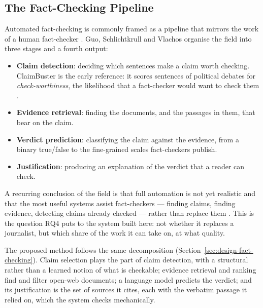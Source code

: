 
\subsection{The Fact-Checking Pipeline}

Automated fact-checking is commonly framed as a pipeline that mirrors
the work of a human fact-checker \cite{thorne2018automated,
guo2022survey}. Guo, Schlichtkrull and Vlachos organise the field into
three stages and a fourth output:

\begin{itemize}
    \item \textbf{Claim detection}: deciding which sentences make a
    claim worth checking. ClaimBuster is the early reference: it scores
    sentences of political debates for \emph{check-worthiness}, the
    likelihood that a fact-checker would want to check them
    \cite{hassan2017claimbuster}.
    \item \textbf{Evidence retrieval}: finding the documents, and the
    passages in them, that bear on the claim.
    \item \textbf{Verdict prediction}: classifying the claim against
    the evidence, from a binary true/false to the fine-grained scales
    fact-checkers publish.
    \item \textbf{Justification}: producing an explanation of the
    verdict that a reader can check.
\end{itemize}

A recurring conclusion of the field is that full automation is not yet
realistic and that the most useful systems assist fact-checkers ---
finding claims, finding evidence, detecting claims already checked ---
rather than replace them \cite{nakov2021assisting}. This is the
question RQ4 puts to the system built here: not whether it replaces a
journalist, but which share of the work it can take on, at what
quality.

The proposed method follows the same decomposition
(Section~\ref{sec:design-fact-checking}). Claim selection plays the
part of claim detection, with a structural rather than a learned notion
of what is checkable; evidence retrieval and ranking find and filter
open-web documents; a language model predicts the verdict; and its
justification is the set of sources it cites, each with the verbatim
passage it relied on, which the system checks mechanically.
